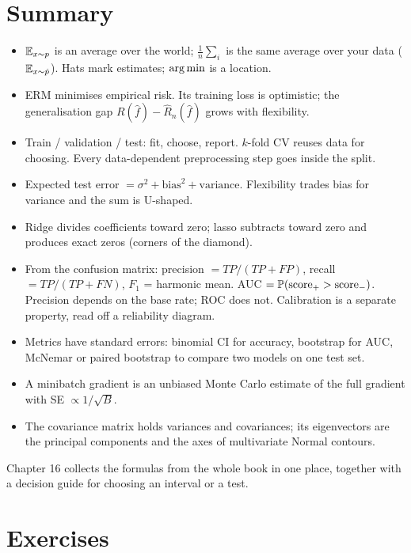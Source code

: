 \section{Summary}

\begin{itemize}
  \item $\E_{x\sim p}$ is an average over the world; $\frac1n\sum_i$ is the same average over
  your data ($\E_{x\sim\hat p}$). Hats mark estimates; $\argmin$ is a location.
  \item ERM minimises empirical risk. Its training loss is optimistic; the generalisation gap
  $R(\hat f)-\hat R_n(\hat f)$ grows with flexibility.
  \item Train / validation / test: fit, choose, report. $k$-fold CV reuses data for choosing.
  Every data-dependent preprocessing step goes inside the split.
  \item Expected test error $=\sigma^2 + \text{bias}^2 + \text{variance}$. Flexibility trades
  bias for variance and the sum is U-shaped.
  \item Ridge divides coefficients toward zero; lasso subtracts toward zero and produces exact
  zeros (corners of the diamond).
  \item From the confusion matrix: precision $=TP/(TP+FP)$, recall $=TP/(TP+FN)$,
  $F_1$ = harmonic mean. AUC $=\P(\text{score}_+>\text{score}_-)$. Precision depends on the
  base rate; ROC does not. Calibration is a separate property, read off a reliability diagram.
  \item Metrics have standard errors: binomial CI for accuracy, bootstrap for AUC, McNemar or
  paired bootstrap to compare two models on one test set.
  \item A minibatch gradient is an unbiased Monte Carlo estimate of the full gradient with SE
  $\propto 1/\sqrt B$.
  \item The covariance matrix holds variances and covariances; its eigenvectors are the
  principal components and the axes of multivariate Normal contours.
\end{itemize}

Chapter 16 collects the formulas from the whole book in one place, together with a decision
guide for choosing an interval or a test.

\section{Exercises}

